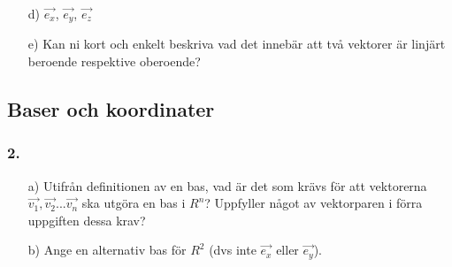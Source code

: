 \documentclass{article}
\begin{document}
\begin{itemize}
	\item[d) ] $\vec{e_x}$, $\vec{e_y}$, $\vec{e_z}$
	\item[e) ] Kan ni kort och enkelt beskriva vad det innebär att två vektorer är linjärt beroende respektive oberoende?
\end{itemize}

\subsection*{Baser och koordinater}
\subsubsection*{2.}
\begin{itemize}
	\item[a) ] Utifrån definitionen av en bas, vad är det som krävs för att vektorerna $\vec{v_1}, \vec{v_2} ... \vec{v_n}$ ska utgöra en bas i $R^n$? Uppfyller något av vektorparen i förra uppgiften dessa krav?
	\item[b) ] Ange en alternativ bas för $R^2$ (dvs inte $\vec{e_x}$ eller $\vec{e_y}$).
\end{itemize}
\end{document}
